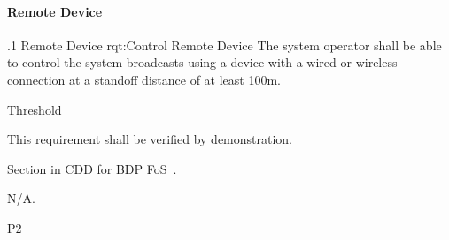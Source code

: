 \paragraph{Remote Device}
\label{para_RemoteDevice}



\ONERQMTVKSA
{\RqtNumberBase.1}
{Remote Device}
{rqt:Control Remote Device}
{The system operator shall be able to control the system broadcasts using a device with a wired or wireless connection at a standoff distance of at least 100m.}
{
	\item [Phase 1] Threshold
}
{This requirement shall be verified by demonstration.}
{
\item [5.5.18] Section in CDD for BDP FoS~\cite{ref__BDP_FOS_CDD}.
}
{
	\item N/A.
}
{P2}
